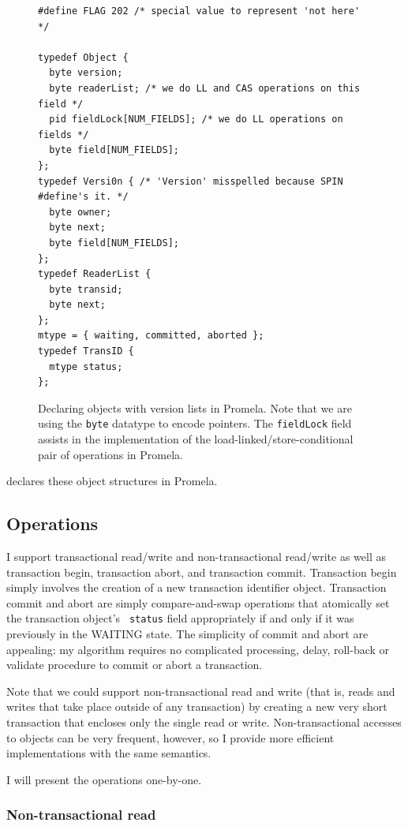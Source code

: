 \begin{figure}
\sis\fontsize{9}{10}
\begin{verbatim}
#define FLAG 202 /* special value to represent 'not here' */

typedef Object {
  byte version;
  byte readerList; /* we do LL and CAS operations on this field */
  pid fieldLock[NUM_FIELDS]; /* we do LL operations on fields */
  byte field[NUM_FIELDS];
};
typedef Versi0n { /* 'Version' misspelled because SPIN #define's it. */
  byte owner;
  byte next;
  byte field[NUM_FIELDS];
};
typedef ReaderList {
  byte transid;
  byte next;
};
mtype = { waiting, committed, aborted };
typedef TransID {
  mtype status;
};
\end{verbatim}
\caption[Declaring objects with version lists in Promela.]
 {Declaring objects with version lists in Promela.  Note that
  we are using the \texttt{byte} datatype to encode pointers.
  The \texttt{fieldLock} field assists in the implementation of the
  load-linked/store-conditional pair of operations in Promela.}
\label{fig:promdecl}
\end{figure}

 declares these object structures in Promela.

\subsection{Operations}%
I support transactional read/write and non-transactional read/write
as well as transaction begin, transaction abort, and transaction
commit.  Transaction begin simply involves the creation of a new
transaction identifier object.  Transaction commit and abort are simply
compare-and-swap operations that atomically set the transaction object's {\tt
  status} field appropriately if and only if it was previously in the
WAITING state.
The simplicity of commit and abort are appealing: my algorithm
requires no complicated processing, delay, roll-back or validate
procedure to commit or abort a transaction.

Note that we could support non-transactional read and write (that is,
reads and writes that take place outside of any transaction) by
creating a new very short transaction that encloses only the single
read or write.  Non-transactional accesses to objects can be very
frequent, however, so I provide more efficient implementations with
the same semantics.

I will present the operations one-by-one.

\subsubsection{Non-transactional read}

